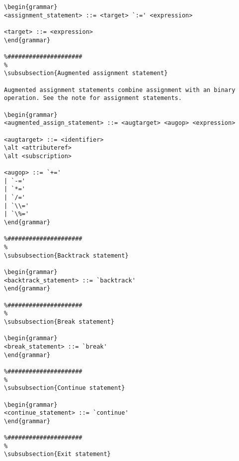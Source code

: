 \begin{verbatim}
\begin{grammar}
<assignment_statement> ::= <target> `:=' <expression>

<target> ::= <expression>
\end{grammar}

%#####################
%
\subsubsection{Augmented assignment statement}

Augmented assignment statements combine assignment with an binary operation. See the note for assignment statements.

\begin{grammar}
<augmented_assign_statement> ::= <augtarget> <augop> <expression>

<augtarget> ::= <identifier>
\alt <attributeref>
\alt <subscription>

<augop> ::= `+='
| `-='
| `*='
| `/='
| `\\='
| `\%='
\end{grammar}

%#####################
%
\subsubsection{Backtrack statement}

\begin{grammar}
<backtrack_statement> ::= `backtrack'
\end{grammar}

%#####################
%
\subsubsection{Break statement}

\begin{grammar}
<break_statement> ::= `break'
\end{grammar}

%#####################
%
\subsubsection{Continue statement}

\begin{grammar}
<continue_statement> ::= `continue'
\end{grammar}

%#####################
%
\subsubsection{Exit statement}


\end{verbatim}
